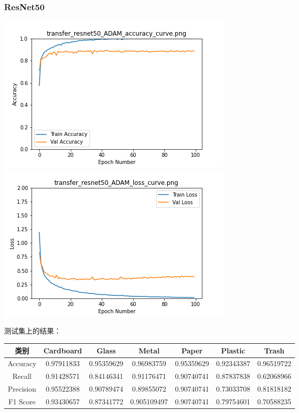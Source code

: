 \documentclass[UTF8]{ctexart}
\begin{document}
\subsubsection{ResNet50}
 
\includegraphics[scale=0.5]{image/transfer_resnet50_ADAM_accuracy_curve.png} 
\includegraphics[scale=0.5]{image/transfer_resnet50_ADAM_loss_curve.png} 

测试集上的结果：

\begin{tabular}{|c|c|c|c|c|c|c|}
\hline 
类别 & Cardboard & Glass & Metal & Paper & Plastic & Trash \\ 
\hline 
Accuracy &0.97911833& 0.95359629& 0.96983759& 0.95359629& 0.92343387& 0.96519722\\
 \hline 
Recall &0.91428571& 0.84146341 &0.91176471& 0.90740741 &0.87837838& 0.62068966\\ 
\hline 
Precision &0.95522388& 0.90789474& 0.89855072& 0.90740741& 0.73033708& 0.81818182\\ 
\hline 
F1 Score &0.93430657& 0.87341772& 0.905109497& 0.90740741 &0.79754601& 0.70588235\\ 
\hline 
\end{tabular}
\end{document}
